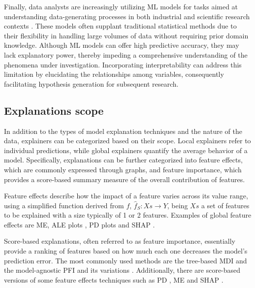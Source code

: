 Finally, data analysts are increasingly utilizing \gls{ML} models for tasks aimed at understanding data-generating processes in both industrial and scientific research contexts \cite{Freiesleben2022ScientificPhenomena, SilvaFilho2023AAchievement}. These models often supplant traditional statistical methods due to their flexibility in handling large volumes of data without requiring prior domain knowledge. Although ML models can offer high predictive accuracy, they may lack explanatory power, thereby impeding a comprehensive understanding of the phenomena under investigation. Incorporating interpretability can address this limitation by elucidating the relationships among variables, consequently facilitating hypothesis generation for subsequent research.

\subsection{Explanations scope}

In addition to the types of model explanation techniques and the nature of the data, explainers can be categorized based on their scope. Local explainers refer to individual predictions, while global explainers quantify the average behavior of a model. Specifically, explanations can be further categorized into feature effects, which are commonly expressed through graphs, and feature importance, which provides a score-based summary measure of the overall contribution of features.

Feature effects describe how the impact of a feature varies across its value range, using a simplified function derived from \(f\), $\hat{f}_S: Xs \xrightarrow{} Y$, being $Xs$ a set of features to be explained with a size typically of 1 or 2 features. Examples of global feature effects are \gls{ME}\cite{Long2021UsingOutcomes, Mize2019AModels}, \gls{ALE} plots \cite{Apley2020VisualizingModels}, \gls{PD} plots \cite{Friedman2001GreedyMachine.} and \gls{SHAP} \cite{10.5555/3295222.3295230}. 

Score-based explanations, often referred to as feature importance, essentially provide a ranking of features based on how much each one decreases the model's prediction error. The most commonly used methods are the tree-based \gls{MDI} \cite{Breiman2001RandomForests} and the model-agnostic \gls{PFI}\cite{Fisher2018AllSimultaneously} and its variations \cite{Molnar2023Model-agnosticApproach, Strobl2008ConditionalForests}. Additionally, there are score-based versions of some feature effects techniques such as \gls{PD} \cite{Greenwell2018AMeasure}, \gls{ME} \cite{long1997regression} and \gls{SHAP} \cite{Lee2023SHAPForecasting}.

